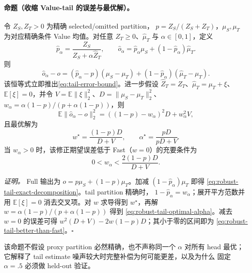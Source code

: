 \paragraph{命题（收缩 Value-tail 的误差与最优解）。}
令 $Z_S,Z_T>0$ 为精确 selected/omitted partition，
$p=Z_S/(Z_S+Z_T)$，$\mu_S,\mu_T$ 为对应精确条件 Value 均值。对任意
$\widehat Z_T\ge0$、$\widehat\mu_T$ 与 $\alpha\in[0,1]$，定义
\begin{equation}
 \widehat p_\alpha=\frac{Z_S}{Z_S+\alpha\widehat Z_T},\qquad
 \widehat o_\alpha=
 \widehat p_\alpha\mu_S+(1-\widehat p_\alpha)\widehat\mu_T.
\end{equation}
则
\begin{equation}
 \widehat o_\alpha-o
 = (\widehat p_\alpha-p)(\mu_S-\mu_T)
 +(1-\widehat p_\alpha)(\widehat\mu_T-\mu_T).
 \label{eq:robust-tail-exact-decomposition}
\end{equation}
该恒等式立即推出\cref{eq:tail-error-bound}。进一步假设
$\widehat Z_T=Z_T$、$\widehat\mu_T=\mu_T+\xi$、
$\mathbb E[\xi]=0$，并令
$V=\mathbb E\|\xi\|_2^2$、$D=\|\mu_S-\mu_T\|_2^2$、
$w_\alpha=\alpha(1-p)/(p+\alpha(1-p))$，则
\begin{equation}
 \mathbb E\|\widehat o_\alpha-o\|_2^2
 =((1-p)-w_\alpha)^2D+w_\alpha^2V,
\end{equation}
且最优解为
\begin{equation}
 w^\star=\frac{(1-p)D}{D+V},\qquad
 \alpha^\star=\frac{pD}{pD+V}.
 \label{eq:robust-tail-optimal-alpha}
\end{equation}
当 $w_\alpha>0$ 时，该修正期望误差低于 Fast（$w=0$）的充要条件为
\begin{equation}
 0<w_\alpha<\frac{2(1-p)D}{D+V}.
 \label{eq:robust-tail-better-than-fast}
\end{equation}

\emph{证明。}
Full 输出为 $o=p\mu_S+(1-p)\mu_T$。加减
$(1-\widehat p_\alpha)\mu_T$ 即得
\cref{eq:robust-tail-exact-decomposition}。tail partition 精确时，
$1-\widehat p_\alpha=w_\alpha$；展开平方范数并用
$\mathbb E[\xi]=0$ 消去交叉项。对 $w$ 求导得到 $w^\star$，再解
$w=\alpha(1-p)/(p+\alpha(1-p))$ 得到
\cref{eq:robust-tail-optimal-alpha}。减去 $w=0$ 的误差可得
$w^2(D+V)-2w(1-p)D$；其小于零的区间即为
\cref{eq:robust-tail-better-than-fast}。\hfill$\square$

该命题不假设 proxy partition 必然精确，也不声称同一个 $\alpha$ 对所有 head
最优；它解释了 tail estimate 噪声较大时完整补偿为何可能更差，以及为什么
固定 $\alpha=.5$ 必须做 held-out 验证。

